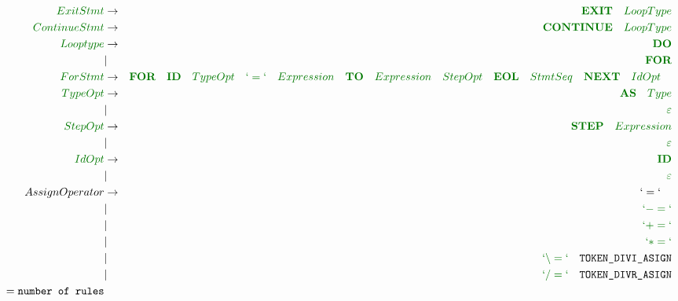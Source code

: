 \documentclass[a4paper,11pt,landscape,leqno]{article}
\begin{document}
\begin{eqnarray}
\textcolor{green1}{ExitStmt} & \rightarrow & \textcolor{green1}{\textbf{EXIT}\quad LoopType}	\\
\textcolor{green1}{ContinueStmt} & \rightarrow & \textcolor{green1}{\textbf{CONTINUE}\quad LoopType}	\\
\textcolor{green1}{Looptype} & \rightarrow & \textcolor{green1}{\textbf{DO}}\\
&	|		&	\textcolor{green1}{\textbf{FOR}}   \\
\textcolor{green1}{ForStmt} &	 \rightarrow	&  \textcolor{green1}{\textbf{FOR}\quad \textbf{ID}\quad TypeOpt\quad `=`\quad Expression\quad \textbf{TO}\quad Expression\quad StepOpt\quad \textbf{EOL}\quad StmtSeq\quad \textbf{NEXT}\quad IdOpt\quad} \\
\textcolor{green1}{TypeOpt} & \rightarrow  & \textcolor{green1}{\textbf{AS}\quad Type} \\
& | &	\textcolor{green1}{\varepsilon} \\
\textcolor{green1}{StepOpt} & \rightarrow  & \textcolor{green1}{\textbf{STEP}\quad Expression} \\
& | &	\textcolor{green1}{\varepsilon} \\
\textcolor{green1}{IdOpt}	& \rightarrow & \textcolor{green1}{\textbf{ID}} \\
		& | &  \textcolor{green1}{\varepsilon} \\
AssignOperator	&	 \rightarrow	&	 `=` \quad		\\
		&	|		&	\textcolor{green1}{`-=`}	\\
		&	|		&	\textcolor{green1}{`+=`}	\\
		&	|		&	\textcolor{green1}{`*=`}	\\
		&	|		&	\textcolor{green1}{`\backslash =`}\quad \textrm{\texttt{TOKEN\_DIVI\_ASIGN}}	\\
		&	|		&	\textcolor{green1}{`/=`}\quad \textrm{\texttt{TOKEN\_DIVR\_ASIGN}}\\
 = \textrm{\texttt{number of rules}} & & 
\end{eqnarray}
\end{document}
